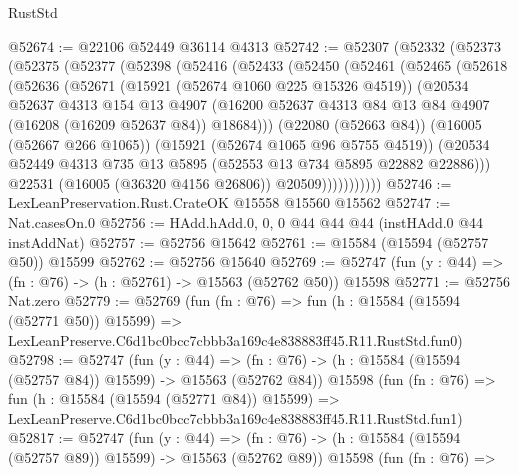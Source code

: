 \begin{lexlean}{RustStd}
\begin{coremodule}
@52674 := @22106 @52449 @36114 @4313
@52742 := @52307
    (@52332
      (@52373
        (@52375
          (@52377
            (@52398
              (@52416
                (@52433
                  (@52450
                    (@52461
                      (@52465
                        (@52618
                          (@52636
                            (@52671
                              (@15921 (@52674 @1060 @225 @15326 @4519))
                              (@20534
                                @52637
                                @4313
                                @154
                                @13
                                @4907
                                (@16200
                                  @52637
                                  @4313
                                  @84
                                  @13
                                  @84
                                  @4907
                                  (@16208 (@16209 @52637 @84))
                                  @18684)))
                            (@22080 (@52663 @84))
                            (@16005 (@52667 @266 @1065))
                            (@15921 (@52674 @1065 @96 @5755 @4519))
                            (@20534
                              @52449
                              @4313
                              @735
                              @13
                              @5895
                              (@52553 @13 @734 @5895 @22882 @22886)))
                          @22531
                          (@16005 (@36320 @4156 @26806))
                          @20509)))))))))))
@52746 := LexLeanPreservation.Rust.CrateOK @15558 @15560 @15562
@52747 := Nat.casesOn.{0}
@52756 := HAdd.hAdd.{0, 0, 0} @44 @44 @44 (instHAdd.{0} @44 instAddNat)
@52757 := @52756 @15642
@52761 := @15584 (@15594 (@52757 @50)) @15599
@52762 := @52756 @15640
@52769 := @52747 (fun (y : @44) => (fn : @76) -> (h : @52761) -> @15563 (@52762 @50)) @15598
@52771 := @52756 Nat.zero
@52779 := @52769
    (fun (fn : @76) =>
    fun (h : @15584 (@15594 (@52771 @50)) @15599) =>
    LexLeanPreserve.C6d1bc0bcc7cbbb3a169c4e838883ff45.R11.RustStd.fun0)
@52798 := @52747
    (fun (y : @44) =>
    (fn : @76) -> (h : @15584 (@15594 (@52757 @84)) @15599) -> @15563 (@52762 @84))
    @15598
    (fun (fn : @76) =>
    fun (h : @15584 (@15594 (@52771 @84)) @15599) =>
    LexLeanPreserve.C6d1bc0bcc7cbbb3a169c4e838883ff45.R11.RustStd.fun1)
@52817 := @52747
    (fun (y : @44) =>
    (fn : @76) -> (h : @15584 (@15594 (@52757 @89)) @15599) -> @15563 (@52762 @89))
    @15598
    (fun (fn : @76) =>

\end{coremodule}
\end{lexlean}

